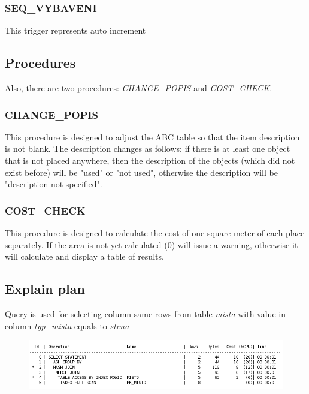 \documentclass[12pt,a4paper]{article}
\begin{document}
\subsubsection{SEQ\_VYBAVENI}

This trigger represents auto increment

\subsection{Procedures}
Also, there are two procedures: \textit{CHANGE\_POPIS} and \textit{COST\_CHECK}.

\subsubsection{CHANGE\_POPIS}

This procedure is designed to adjust the ABC table so that the item description 
is not blank. The description changes as follows: if there is at least one 
object that is not placed anywhere, then the description of the objects (which 
did not exist before) will be "used" or "not used", otherwise the description 
will be "description not specified".

\subsubsection{COST\_CHECK}

This procedure is designed to calculate the cost of one square meter of each 
place separately. If the area is not yet calculated (0) will issue a warning, 
otherwise it will calculate and display a table of results.

\subsection{Explain plan}

Query is used for selecting column same rows from table \textit{mista} with value 
in column \textit{typ\_mista} equals to \textit{stena}

\begin{figure}[h!]
    \centering
    \includegraphics[width=\textwidth,height=\textheight,keepaspectratio]
    {prev_explain_plan.png}
\end{figure}
\end{document}
